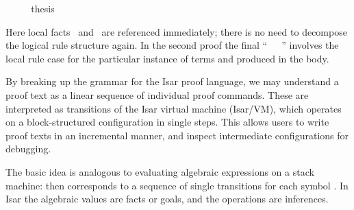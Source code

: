 \begin{isabellebody}
\begin{minipage}{0.5\textwidth}
%
\isadelimnoproof
\isanewline
%
\endisadelimnoproof
%
\isadelimproof
\ \ %
\endisadelimproof
%
\isatagproof
{}\isamarkupfalse%
\ \isamarkupfalse%
\ thesis\ \isacommand{{\isachardot}{\isachardot}}\isamarkupfalse%
\isanewline
{}\isamarkupfalse%
%
\endisatagproof
{\isafoldproof}%
%
\isadelimproof
%
\endisadelimproof
%
\end{minipage}
%
\begin{isamarkuptext}%
\medskip\noindent Here local facts \isacharbackquoteopen{}\isacharbackquoteclose\ and \isacharbackquoteopen{}\isacharbackquoteclose\ are referenced immediately; there is no
  need to decompose the logical rule structure again.  In the second
  proof the final ``\hyperlink{command.then}{\mbox{}}~\hyperlink{command.show}{\mbox{}}~~\hyperlink{command.ddot}{\mbox{\isa{\isacommand{{\isachardot}{\isachardot}}}}}''  involves the local rule case  for the particular instance of terms  and  produced in the body.%
\end{isamarkuptext}%
\isamarkuptrue%
%
\isamarkuptrue%
%
\begin{isamarkuptext}%
By breaking up the grammar for the Isar proof language, we may
  understand a proof text as a linear sequence of individual proof
  commands.  These are interpreted as transitions of the Isar virtual
  machine (Isar/VM), which operates on a block-structured
  configuration in single steps.  This allows users to write proof
  texts in an incremental manner, and inspect intermediate
  configurations for debugging.

  The basic idea is analogous to evaluating algebraic expressions on a
  stack machine:  then corresponds to a sequence
  of single transitions for each symbol .
  In Isar the algebraic values are facts or goals, and the operations
  are inferences.


\end{isamarkuptext}
\end{isabellebody}

